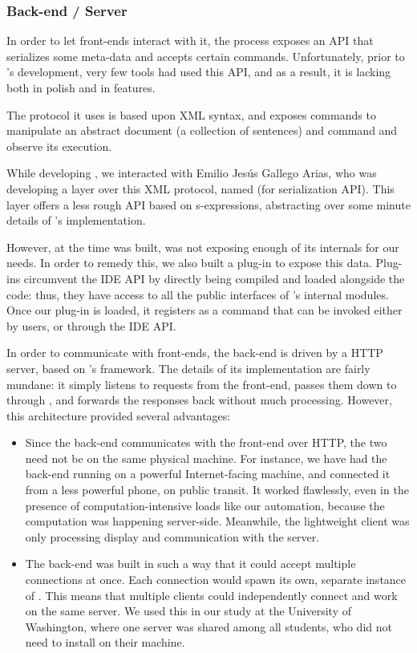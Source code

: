 \subsubsection*{Back-end / Server}

In order to let front-ends interact with it, the \Coq{} process exposes an API
that serializes some meta-data and accepts certain commands.  Unfortunately,
prior to \PeaCoq{}'s development, very few tools had used this API, and as a
result, it is lacking both in polish and in features.

The protocol it uses is based upon XML syntax, and exposes commands to
manipulate an abstract document (a collection of \Coq{} sentences) and command
and observe its execution.

While developing \PeaCoq{}, we interacted with Emilio Jesús Gallego Arias, who
was developing a layer over this XML protocol, named \SerAPI{} (for
serialization API).  This layer offers a less rough API based on s-expressions,
abstracting over some minute details of \Coq{}'s implementation.

However, at the time \PeaCoq{} was built, \Coq{} was not exposing enough of its
internals for our needs.  In order to remedy this, we also built a \Coq{}
plug-in to expose this data.  Plug-ins circumvent the IDE API by directly being
compiled and loaded alongside the \Coq{} code: thus, they have access to all the
public interfaces of \Coq{}'s internal modules.  Once our plug-in is loaded, it
registers as a \Vernacular{} command that can be invoked either by users, or
through the IDE API.\@

In order to communicate with front-ends, the back-end is driven by a HTTP
server, based on \Haskell{}'s \Snap{} framework.  The details of its
implementation are fairly mundane: it simply listens to requests from the
front-end, passes them down to \Coq{} through \SerAPI{}, and forwards the
responses back without much processing.  However, this architecture provided
several advantages:

\begin{itemize}

  \item Since the back-end communicates with the front-end over HTTP, the two
need not be on the same physical machine.  For instance, we have had the
back-end running on a powerful Internet-facing machine, and connected it from a
less powerful phone, on public transit.  It worked flawlessly, even in the
presence of computation-intensive loads like our automation, because the
computation was happening server-side.  Meanwhile, the lightweight client was
only processing display and communication with the server.

  \item The back-end was built in such a way that it could accept multiple
connections at once.  Each connection would spawn its own, separate instance of
\Coq{}.  This means that multiple clients could independently connect and work
on the same server.  We used this in our study at the University of Washington,
where one server was shared among all students, who did not need to install
\Coq{} on their machine.

\end{itemize}

